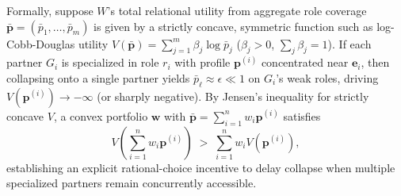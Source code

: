 Formally, suppose $W$'s total relational utility from aggregate role coverage
$\bar{\mathbf{p}} = (\bar{p}_1, \dots, \bar{p}_m)$ is given by a strictly concave,
symmetric function such as log-Cobb-Douglas utility
$V(\bar{\mathbf{p}}) = \sum_{j=1}^m \beta_j \log \bar{p}_j$ ($\beta_j > 0$,
$\sum_j \beta_j = 1$). If each partner $G_i$ is specialized in role $r_i$ with
profile $\mathbf{p}^{(i)}$ concentrated near $\mathbf{e}_i$, then collapsing
onto a single partner yields $\bar{p}_\ell \approx \epsilon \ll 1$ on $G_i$'s
weak roles, driving $V(\mathbf{p}^{(i)}) \to -\infty$ (or sharply negative).
By Jensen's inequality for strictly concave $V$, a convex portfolio $\mathbf{w}$
with $\bar{\mathbf{p}} = \sum_{i=1}^n w_i \mathbf{p}^{(i)}$ satisfies
\begin{equation}
  V\!\left(\sum_{i=1}^{n} w_i \mathbf{p}^{(i)}\right)
  \;>\; \sum_{i=1}^{n} w_i V(\mathbf{p}^{(i)}),
  \label{eq:jensen-portfolio}
\end{equation}
establishing an explicit rational-choice incentive to delay collapse when
multiple specialized partners remain concurrently accessible.

